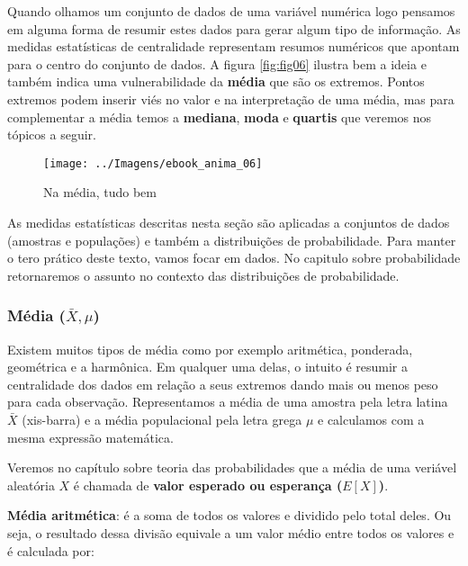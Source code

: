 \documentclass[12pt,]{style/krantz}
\renewenvironment{quote}{\begin{VF}}{\end{VF}}
\theoremstyle{definition}
\theoremstyle{definition}
\theoremstyle{definition}
\theoremstyle{remark}
\begin{document}
Quando olhamos um conjunto de dados de uma variável numérica logo
pensamos em alguma forma de resumir estes dados para gerar algum tipo de
informação. As medidas estatísticas de centralidade representam resumos
numéricos que apontam para o centro do conjunto de dados. A figura
\ref{fig:fig06} ilustra bem a ideia e também indica uma vulnerabilidade
da \textbf{média} que são os extremos. Pontos extremos podem inserir
viés no valor e na interpretação de uma média, mas para complementar a
média temos a \textbf{mediana}, \textbf{moda} e \textbf{quartis} que
veremos nos tópicos a seguir.

\begin{figure}[H]

{\centering \texttt{[image: ../Imagens/ebook\_anima\_06]} 

}

\caption{Na média, tudo bem}\label{fig:fig07}
\end{figure}

\begin{quote}
As medidas estatísticas descritas nesta seção são aplicadas a conjuntos
de dados (amostras e populações) e também a distribuições de
probabilidade. Para manter o tero prático deste texto, vamos focar em
dados. No capitulo sobre probabilidade retornaremos o assunto no
contexto das distribuições de probabilidade.
\end{quote}

\subsubsection{\texorpdfstring{Média
(\(\bar X, \mu\))}{Média (\textbackslash{}bar X, \textbackslash{}mu)}}\label{media-bar-x-mu}

Existem muitos tipos de média como por exemplo aritmética, ponderada,
geométrica e a harmônica. Em qualquer uma delas, o intuito é resumir a
centralidade dos dados em relação a seus extremos dando mais ou menos
peso para cada observação. Representamos a média de uma amostra pela
letra latina \(\bar X\) (xis-barra) e a média populacional pela letra
grega \(\mu\) e calculamos com a mesma expressão matemática.

\begin{quote}
Veremos no capítulo sobre teoria das probabilidades que a média de uma
veriável aleatória \(X\) é chamada de \textbf{valor esperado ou
esperança (\(E[X]\))}.
\end{quote}

\textbf{Média aritmética}: é a soma de todos os valores e dividido pelo
total deles. Ou seja, o resultado dessa divisão equivale a um valor
médio entre todos os valores e é calculada por:
\end{document}
